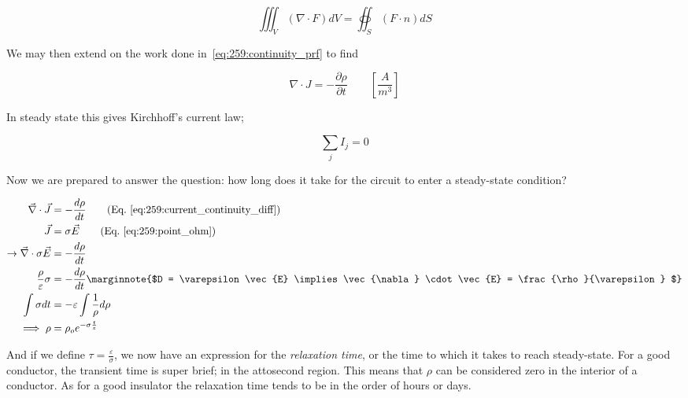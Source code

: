 \documentclass[10pt]{article}
\begin{document}
\begin{equation}
	\iiint_V(\nabla \cdot F) dV = \oiint_S(F\cdot n) dS
\end{equation}


We may then extend on the work done in~\ref{eq:259:continuity_prf} to find

\begin{equation}
	\nabla \cdot J = -\frac{\partial \rho}{\partial t} \qquad [\frac{A}{m^3}] 
\end{equation}

In steady state this gives Kirchhoff's current law;

\begin{equation}
	\sum_j I_j = 0
	\label{eq:259:kirchoff_current}
\end{equation}


Now we are prepared to answer the question: how long does it take for the circuit to enter a steady-state condition?

\begin{equation}
	\begin{split}
		\vec{\nabla} \cdot  \vec{J} &= -\frac{d\rho}{dt}  \qquad \text{(Eq.~\ref{eq:259:current_continuity_diff})} \\
	\vec{J} &= \sigma \vec{E} \qquad \text{(Eq.~\ref{eq:259:point_ohm})}  \\
	\rightarrow \vec{\nabla}  \cdot \sigma \vec{E} &= -\frac{d\rho}{dt} \\
	\frac{\rho}{\varepsilon} \sigma &=  -\frac{d\rho}{dt}  \marginnote{$D = \varepsilon \vec{E}  \implies \vec{\nabla}  \cdot \vec{E} = \frac{\rho}{\varepsilon}   $} \\
	\int \sigma dt &= -\varepsilon \int \frac{1}{\rho} d\rho \\
	\implies \rho &= \rho_o e^{-\sigma \frac{t}{\varepsilon}} \\
	\end{split}
	\label{eq:259:time_deriv}
\end{equation}

And if we define $ \tau = \frac{\varepsilon}{\sigma} $, we now have an expression for the \textit{relaxation time}, or the time to which it takes to reach steady-state.
For a good conductor, the transient time is super brief; in the attosecond region.
This means that $ \rho $ can be considered zero in the interior of a conductor.
As for a good insulator the relaxation time tends to be in the order of hours or days.
\end{document}
